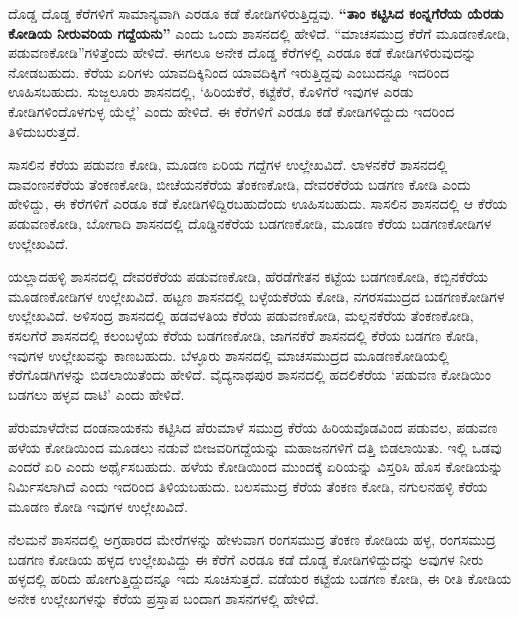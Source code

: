 ದೊಡ್ಡ ದೊಡ್ಡ ಕೆರೆಗಳಿಗೆ ಸಾಮಾನ್ಯವಾಗಿ ಎರಡೂ ಕಡೆ ಕೋಡಿಗಳಿರುತ್ತಿದ್ದವು. \textbf{“ತಾಂ ಕಟ್ಟಿಸಿದ ಕಂನ್ನಗೆರೆಯ ಯೆರಡು ಕೋಡಿಯ ನೀರುವರಿಯ ಗದ್ದೆಯನು”} ಎಂದು ಒಂದು ಶಾಸನದಲ್ಲಿ ಹೇಳಿದೆ. “ಮಾಚಸಮುದ್ರ ಕೆರೆಗೆ ಮೂಡಣಕೋಡಿ, ಪಡುವಣಕೋಡಿ”ಗಳಿತ್ತೆಂದು ಹೇಳಿದೆ. ಈಗಲೂ ಅನೇಕ ದೊಡ್ಡ ಕೆರೆಗಳಲ್ಲಿ ಎರಡೂ ಕಡೆ ಕೋಡಿಗಳಿರುವುದನ್ನು ನೋಡಬಹುದು. ಕೆರೆಯ ಏರಿಗಳು ಯಾವದಿಕ್ಕಿನಿಂದ ಯಾವದಿಕ್ಕಿಗೆ ಇರುತ್ತಿದ್ದವು ಎಂಬುದನ್ನೂ ಇದರಿಂದ ಊಹಿಸಬಹುದು. ಸುಜ್ಜಲೂರು ಶಾಸನದಲ್ಲಿ, ‘ಹಿರಿಯಕೆರೆ, ಕಟ್ಟೆಕೆರೆ, ಕೊಳಿಗೆರೆ ಇವುಗಳ ಎರಡು ಕೋಡಿಗಳಿಂದೊಳಗುಳ್ಳ ಯೆಲ್ಲೆ’ ಎಂದು ಹೇಳಿದೆ. ಈ ಕೆರೆಗಳಿಗೆ ಎರಡೂ ಕಡೆ ಕೋಡಿಗಳಿದ್ದುದು ಇದರಿಂದ ತಿಳಿದುಬರುತ್ತದೆ.

ಸಾಸಲಿನ ಕೆರೆಯ ಪಡುವಣ ಕೋಡಿ, ಮೂಡಣ ಏರಿಯ ಗದ್ದೆಗಳ ಉಲ್ಲೇಖವಿದೆ. ಲಾಳನಕೆರೆ ಶಾಸನದಲ್ಲಿ ದಾವಂಣನಕೆರೆಯ ತೆಂಕಣಕೋಡಿ, ಬೀಚೆಯನಕೆರೆಯ ತೆಂಕಣಕೋಡಿ, ದೇವರಕೆರೆಯ ಬಡಗಣ ಕೋಡಿ ಎಂದು ಹೇಳಿದ್ದು, ಈ ಕೆರೆಗಳಿಗೆ ಎರಡೂ ಕಡೆ ಕೋಡಿಗಳಿದ್ದಿರಬಹುದೆಂದು ಊಹಿಸಬಹುದು. ಸಾಸಲಿನ ಶಾಸನದಲ್ಲಿ ಆ ಕೆರೆಯ ಪಡುವಣಕೋಡಿ, ಬೋಗಾದಿ ಶಾಸನದಲ್ಲಿ ದೊಡ್ಡಿನಕೆರೆಯ ಬಡಗಣಕೋಡಿ, ಮೂಡಣ ಕೆರೆಯ ಬಡಗಣಕೋಡಿಗಳ ಉಲ್ಲೇಖವಿದೆ.

ಯಲ್ಲಾದಹಳ್ಳಿ ಶಾಸನದಲ್ಲಿ ದೇವರಕೆರೆಯ ಪಡುವಣಕೋಡಿ, ಹೆರಡೆಗೇತನ ಕಟ್ಟೆಯ ಬಡಗಣಕೋಡಿ, ಕಬ್ಬಿನಕೆರೆಯ ಮೂಡಣಕೋಡಿಗಳ ಉಲ್ಲೇಖವಿದೆ. ಹಟ್ಟಣ ಶಾಸನದಲ್ಲಿ ಬಳ್ಳೆಯಕೆರೆಯ ಕೋಡಿ, ನಗರಸಮುದ್ರದ ಬಡಗಣಕೋಡಿಗಳ ಉಲ್ಲೇಖವಿದೆ. ಅಳಿಸಂದ್ರ ಶಾಸನದಲ್ಲಿ ಹಡವಳತಿಯ ಕೆರೆಯ ಪಡುವಣಕೋಡಿ, ಮಲ್ಲನಕೆರೆಯ ತೆಂಕಣಕೋಡಿ, ಕಸಲಗೆರೆ ಶಾಸನದಲ್ಲಿ ಕಲಂಬಳ್ಳೆಯ ಕೆರೆಯ ಬಡಗಣಕೋಡಿ, ಜಾಗನಕೆರೆ ಶಾಸನದಲ್ಲಿ ಕೆರೆಯ ಬಡಗಣ ಕೋಡಿ, ಇವುಗಳ ಉಲ್ಲೇಖವನ್ನು ಕಾಣಬಹುದು. ಬೆಳ್ಳೂರು ಶಾಸನದಲ್ಲಿ ಮಾಚಸಮುದ್ರದ ಮೂಡಣಕೋಡಿಯಲ್ಲಿ ಕೆರೆಗೊಡಗಿಗಳನ್ನು ಬಿಡಲಾಯಿತೆಂದು ಹೇಳಿದೆ. ವೈದ್ಯನಾಥಪುರ ಶಾಸನದಲ್ಲಿ ಹದಲಿಕೆರೆಯ ‘ಪಡುವಣ ಕೋಡಿಯಿಂ ಬಡಗಲು ಹಳ್ಳವ ದಾಟಿ’ ಎಂದು ಹೇಳಿದೆ.

ಪೆರುಮಾಳೆದೇವ ದಂಡನಾಯಕನು ಕಟ್ಟಿಸಿದ ಪೆರುಮಾಳೆ ಸಮುದ್ರ ಕೆರೆಯ ಹಿರಿಯವೊಡವಿಂದ ಪಡುವಲ, ಪಡುವಣ ಹಳೆಯ ಕೋಡಿಯಿಂದ ಮೂಡಲು ನಡುವೆ ಬೀಜವರಿಗದ್ದೆಯನ್ನು ಮಹಾಜನಗಳಿಗೆ ದತ್ತಿ ಬಿಡಲಾಯಿತು. ಇಲ್ಲಿ ಒಡವು ಎಂದರೆ ಏರಿ ಎಂದು ಅರ್ಥೈಸಬಹುದು. ಹಳೆಯ ಕೋಡಿಯಿಂದ ಮುಂದಕ್ಕೆ ಏರಿಯನ್ನು ವಿಸ್ತರಿಸಿ ಹೊಸ ಕೋಡಿಯನ್ನು ನಿರ್ಮಿಸಲಾಗಿದೆ ಎಂದು ಇದರಿಂದ ತಿಳಿಯಬಹುದು. ಬಲಸಮುದ್ರ ಕೆರೆಯ ತೆಂಕಣ ಕೋಡಿ, ನಗುಲನಹಳ್ಳಿ ಕೆರೆಯ ಮೂಡಣ ಕೋಡಿ ಇವುಗಳ ಉಲ್ಲೇಖವಿದೆ.

ನೆಲಮನೆ ಶಾಸನದಲ್ಲಿ ಅಗ್ರಹಾರದ ಮೇರೆಗಳನ್ನು ಹೇಳುವಾಗ ರಂಗಸಮುದ್ರ ತೆಂಕಣ ಕೋಡಿಯ ಹಳ್ಳ, ರಂಗಸಮುದ್ರ ಬಡಗಣ ಕೋಡಿಯ ಹಳ್ಳದ ಉಲ್ಲೇಖವಿದ್ದು ಈ ಕೆರೆಗೆ ಎರಡೂ ಕಡೆ ದೊಡ್ಡ ಕೋಡಿಗಳಿದ್ದುದನ್ನು ಅವುಗಳ ನೀರು ಹಳ್ಳದಲ್ಲಿ ಹರಿದು ಹೋಗುತ್ತಿದ್ದುದನ್ನೂ ಇದು ಸೂಚಿಸುತ್ತದೆ. ವಡೆಯರ ಕಟ್ಟೆಯ ಬಡಗಣ ಕೋಡಿ, ಈ ರೀತಿ ಕೋಡಿಯ ಅನೇಕ ಉಲ್ಲೇಖಗಳನ್ನು ಕೆರೆಯ ಪ್ರಸ್ತಾಪ ಬಂದಾಗ ಶಾಸನಗಳಲ್ಲಿ ಹೇಳಿದೆ.

